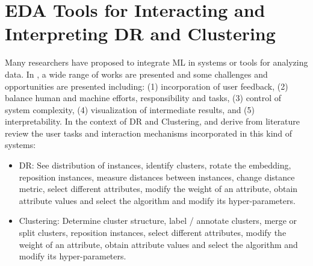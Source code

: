 



\section{EDA Tools for Interacting and Interpreting DR and Clustering}
\label{section2.4}

Many researchers have proposed to integrate ML in systems or tools for analyzing data. In \cite{Endert2017b}, a wide range of works are presented and some challenges and opportunities are presented including: (1) incorporation of user feedback, (2) balance human and machine efforts, responsibility and tasks, (3) control of system complexity, (4) visualization of intermediate results, and (5) interpretability. In the context of DR and Clustering, \cite{Wenskovitch2018} and \cite{Sacha2017g} derive from literature review the user tasks and interaction mechanisms incorporated in this kind of systems:

\begin{itemize}
\item DR: See distribution of instances, identify clusters, rotate the embedding, reposition instances, measure distances between instances, change distance metric, select different attributes, modify the weight of an attribute, obtain attribute values and select the algorithm and modify its hyper-parameters.
\item Clustering: Determine cluster structure, label / annotate clusters, merge or split clusters, reposition instances, select different attributes, modify the weight of an attribute, obtain attribute values and select the algorithm and modify its hyper-parameters.
\end{itemize}

